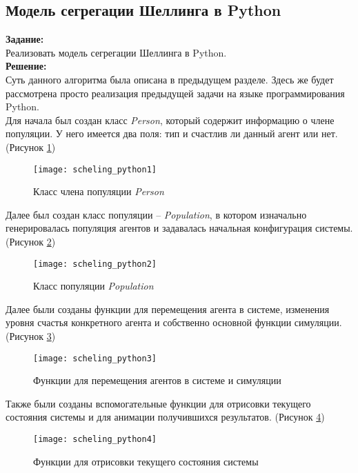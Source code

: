 \subsection*{Модель сегрегации Шеллинга в Python}

\textbf{Задание:}\\
Реализовать модель сегрегации Шеллинга в Python.\\

\textbf{Решение:}\\
Суть данного алгоритма была описана в предыдущем разделе. Здесь же будет рассмотрена просто реализация предыдущей задачи на языке программирования Python.\\

Для начала был создан класс \textit{Person}, который содержит информацию о члене популяции. У него имеется два поля: тип и счастлив ли данный агент или нет. (Рисунок \ref{fig:scheling_python1})
\begin{figure}[h]
	\centering \texttt{[image: scheling\_python1]}
	\caption{Класс члена популяции \textit{Person}}
	\label{fig:scheling_python1}
\end{figure}

Далее был создан класс популяции -- \textit{Population}, в котором изначально генерировалась популяция агентов и задавалась начальная конфигурация системы. (Рисунок \ref{fig:scheling_python2})
\begin{figure}[h]
	\centering \texttt{[image: scheling\_python2]}
	\caption{Класс популяции \textit{Population}}
	\label{fig:scheling_python2}
\end{figure}

\newpage

Далее были созданы функции для перемещения агента в системе, изменения уровня счастья конкретного агента и собственно основной функции симуляции. (Рисунок \ref{fig:scheling_python3})
\begin{figure}[h]
	\centering \texttt{[image: scheling\_python3]}
	\caption{Функции для перемещения агентов в системе и симуляции}
	\label{fig:scheling_python3}
\end{figure}

Также были созданы вспомогательные функции для отрисовки текущего состояния системы и для анимации получившихся результатов. (Рисунок \ref{fig:scheling_python4})
\begin{figure}[h]
	\centering \texttt{[image: scheling\_python4]}
	\caption{Функции для отрисовки текущего состояния системы}
	\label{fig:scheling_python4}
\end{figure}


